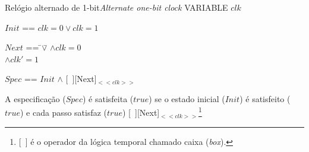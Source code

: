 \begin{frame}{Relógio alternado de 1-bit}{\em Alternate one-bit clock}
  VARIABLE $clk$  

  \pause

  \bigskip
   $Init$ == $clk = 0 \lor clk=1$ \\

  \pause
  \bigskip\begingroup

    \hfill
    \begin{tabbing}
      $Next$ == \=$\lor$\= $\land clk = 0$\\
      \>\>$\land clk' = 1$\\
    \end{tabbing}
  
\endgroup

\pause\bigskip

$Spec$ == $Init$ $\land$ [\ ][Next]$_{<<clk>>}$ 

\pause\medskip

{\scriptsize\color{blue} A especificação ($Spec$) é satisfeita ($true$) se o
  estado inicial ($Init$) é satisfeito ($true$) e cada passo satisfaz
  ($true$) [\ ][Next]$_{<<clk>>}$\footnote{\tiny [\ ] é o operador da lógica temporal
   chamado caixa ({\em box}).}}

\end{frame}

